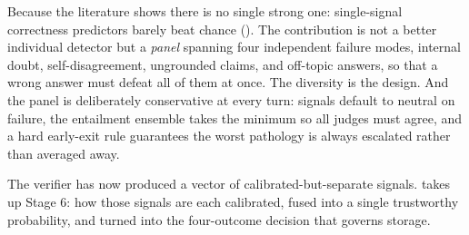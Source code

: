 \begin{defence}
Because the literature shows there is no single strong one: single-signal correctness
predictors barely beat chance (). The contribution is not a better
individual detector but a \emph{panel} spanning four independent failure modes,
internal doubt, self-disagreement, ungrounded claims, and off-topic answers, so that
a wrong answer must defeat all of them at once. The diversity is the design. And the
panel is deliberately conservative at every turn: signals default to neutral on
failure, the entailment ensemble takes the minimum so all judges must agree, and a
hard early-exit rule guarantees the worst pathology is always escalated rather than
averaged away.
\end{defence}

The verifier has now produced a vector of calibrated-but-separate signals.
 takes up Stage 6: how those signals are each calibrated, fused
into a single trustworthy probability, and turned into the four-outcome decision that
governs storage.
